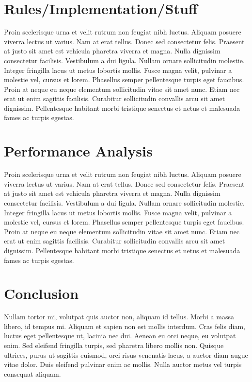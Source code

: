 \documentclass[10pt]{article}
\begin{document}
\begin{multicols}{2}
		\section{Rules/Implementation/Stuff}
		Proin scelerisque urna et velit rutrum non feugiat nibh luctus. Aliquam posuere viverra lectus ut varius. Nam at erat tellus. Donec sed consectetur felis. Praesent at justo sit amet est vehicula pharetra viverra et magna. Nulla dignissim consectetur facilisis. Vestibulum a dui ligula. Nullam ornare sollicitudin molestie. Integer fringilla lacus ut metus lobortis mollis. Fusce magna velit, pulvinar a molestie vel, cursus et lorem. Phasellus semper pellentesque turpis eget faucibus. Proin at neque eu neque elementum sollicitudin vitae sit amet nunc. Etiam nec erat ut enim sagittis facilisis. Curabitur sollicitudin convallis arcu sit amet dignissim. Pellentesque habitant morbi tristique senectus et netus et malesuada fames ac turpis egestas.
		
		\section{Performance Analysis}
		Proin scelerisque urna et velit rutrum non feugiat nibh luctus. Aliquam posuere viverra lectus ut varius. Nam at erat tellus. Donec sed consectetur felis. Praesent at justo sit amet est vehicula pharetra viverra et magna. Nulla dignissim consectetur facilisis. Vestibulum a dui ligula. Nullam ornare sollicitudin molestie. Integer fringilla lacus ut metus lobortis mollis. Fusce magna velit, pulvinar a molestie vel, cursus et lorem. Phasellus semper pellentesque turpis eget faucibus. Proin at neque eu neque elementum sollicitudin vitae sit amet nunc. Etiam nec erat ut enim sagittis facilisis. Curabitur sollicitudin convallis arcu sit amet dignissim. Pellentesque habitant morbi tristique senectus et netus et malesuada fames ac turpis egestas.
		
		
		\section{Conclusion}
		Nullam tortor mi, volutpat quis auctor non, aliquam id tellus. Morbi a massa libero, id tempus mi. Aliquam et sapien non est mollis interdum. Cras felis diam, luctus eget pellentesque ut, lacinia nec dui. Aenean eu orci neque, eu volutpat enim. Sed eleifend fringilla turpis, sed pharetra libero mollis non. Quisque ultrices, purus ut sagittis euismod, orci risus venenatis lacus, a auctor diam augue vitae dolor. Duis eleifend pulvinar enim ac mollis. Nulla auctor metus vel turpis consequat aliquam.
		

\end{multicols}
\end{document}
